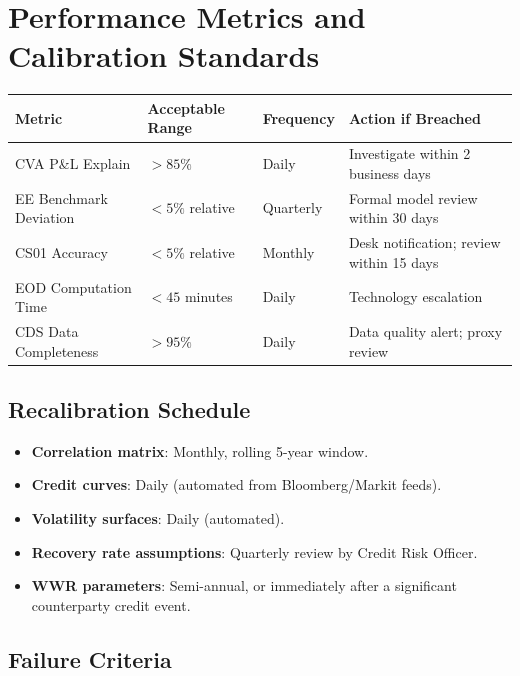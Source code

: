 \documentclass[11pt,a4paper]{article}
\begin{document}
\section{Performance Metrics and Calibration Standards}

\begin{longtable}{@{}llll@{}}
\toprule
\textbf{Metric} & \textbf{Acceptable Range} & \textbf{Frequency} & \textbf{Action if Breached} \\
\midrule
\endhead
\bottomrule
\endfoot
CVA P\&L Explain         & $>85\%$           & Daily     & Investigate within 2 business days \\
EE Benchmark Deviation   & $<5\%$ relative   & Quarterly & Formal model review within 30 days \\
CS01 Accuracy            & $<5\%$ relative   & Monthly   & Desk notification; review within 15 days \\
EOD Computation Time     & $<45$ minutes     & Daily     & Technology escalation \\
CDS Data Completeness    & $>95\%$           & Daily     & Data quality alert; proxy review \\
\end{longtable}

\subsection{Recalibration Schedule}

\begin{itemize}[noitemsep]
  \item \textbf{Correlation matrix}: Monthly, rolling 5-year window.
  \item \textbf{Credit curves}: Daily (automated from Bloomberg/Markit feeds).
  \item \textbf{Volatility surfaces}: Daily (automated).
  \item \textbf{Recovery rate assumptions}: Quarterly review by Credit Risk Officer.
  \item \textbf{WWR parameters}: Semi-annual, or immediately after a
        significant counterparty credit event.
\end{itemize}

\subsection{Failure Criteria}
\end{document}
